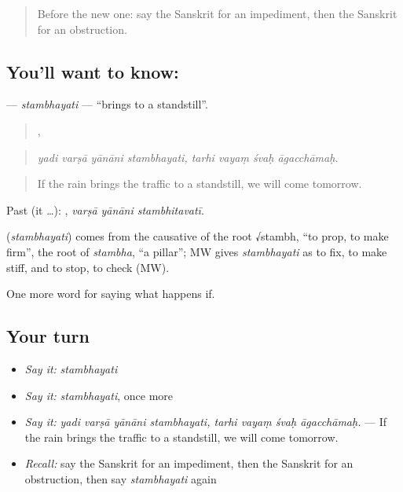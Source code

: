 \label{lesson:SA-C533-stambhayati}



\begin{quote}
Before the new one: say the Sanskrit for an impediment, then the Sanskrit for an obstruction.
\end{quote}

\subsection*{You'll want to know: }
\textbf{} — \emph{stambhayati} — \textquotedblleft{}brings to a standstill\textquotedblright{}.

\begin{quote}
   ,    
\end{quote}

\begin{quote}
\emph{yadi varṣā yānāni stambhayati, tarhi vayaṃ śvaḥ āgacchāmaḥ.}
\end{quote}

\begin{quote}
If the rain brings the traffic to a standstill, we will come tomorrow.
\end{quote}

Past (it …):   , \emph{varṣā yānāni stambhitavatī}.

\begin{cousinweb}
\textbf{} (\emph{stambhayati}) comes from the causative of the root √stambh, \textquotedblleft{}to prop, to make firm\textquotedblright{}, the root of \emph{stambha}, \textquotedblleft{}a pillar\textquotedblright{}; MW gives \emph{stambhayati} as to fix, to make stiff, and to stop, to check (MW).
\end{cousinweb}

\begin{grammarlens}[title={What you've built}]
One more word for saying what happens if.
\end{grammarlens}

\subsection*{Your turn}
\begin{itemize}
\raggedright
  \item \emph{Say it:} \emph{stambhayati}
  \item \emph{Say it:} \emph{stambhayati}, once more
  \item \emph{Say it:} \emph{yadi varṣā yānāni stambhayati, tarhi vayaṃ śvaḥ āgacchāmaḥ.} — If the rain brings the traffic to a standstill, we will come tomorrow.
  \item \emph{Recall:} say the Sanskrit for an impediment, then the Sanskrit for an obstruction, then say \emph{stambhayati} again
\end{itemize}

